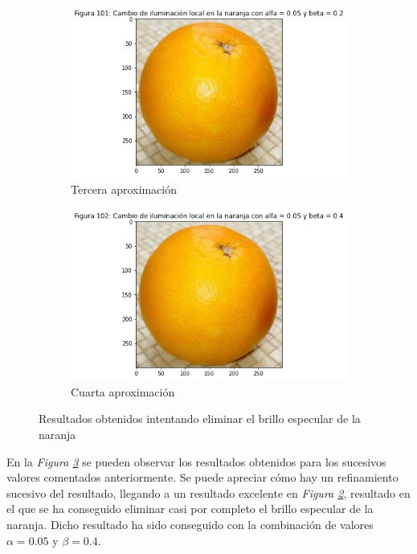 \documentclass[11pt,twoside,titlepage,a4paper]{article}
\numberwithin{equation}{section} %
\theoremstyle{usual}
\begin{document}
\begin{figure}[h]
\begin{subfigure}[b]{.45\textwidth}
        \centering
        \includegraphics[width=\textwidth]{imagenes/PoissonImageEditing_cell_103_output_2.png}
        \caption{Tercera aproximación}
        \label{fig:Naranja3Aprox}
    \end{subfigure}%
    \centering
    \begin{subfigure}[b]{.45\textwidth}
        \centering
        \includegraphics[width=\textwidth]{imagenes/PoissonImageEditing_cell_103_output_3.png}
        \caption{Cuarta aproximación}
        \label{fig:Naranja4Aprox}%
    \end{subfigure}
    \caption{Resultados obtenidos intentando eliminar el brillo especular de la naranja}
    \label{fig:resultadosNaranja}
\end{figure}

En la \textit{Figura \ref{fig:resultadosNaranja}} se pueden observar los resultados obtenidos para los sucesivos valores comentados anteriormente. Se puede apreciar cómo hay un refinamiento sucesivo del resultado, llegando a un resultado excelente en \textit{Figura \ref{fig:Naranja4Aprox}}, resultado en el que se ha conseguido eliminar casi por completo el brillo especular de la naranja. Dicho resultado ha sido conseguido con la combinación de valores $\alpha = 0.05$ y $\beta = 0.4$.
\end{document}
